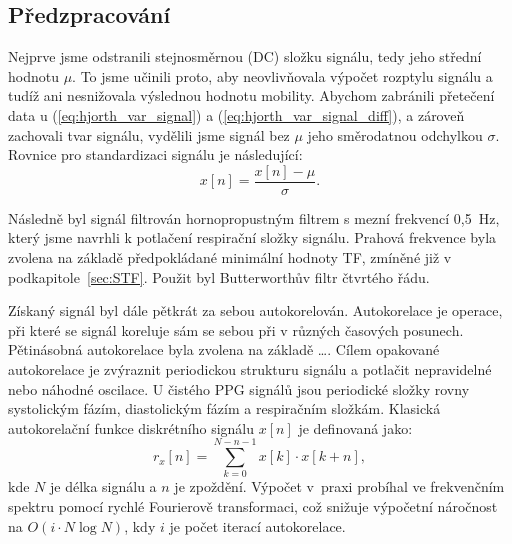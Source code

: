 \subsection*{Předzpracování}
\label{sec:predzpracovani}
Nejprve jsme odstranili stejnosměrnou (\acs{DC}) složku signálu, tedy jeho střední hodnotu \(\mu\).
To jsme učinili proto, aby neovlivňovala výpočet rozptylu signálu a tudíž ani nesnižovala výslednou hodnotu mobility.
Abychom zabránili přetečení data u (\ref{eq:hjorth_var_signal}) a (\ref{eq:hjorth_var_signal_diff}), a zároveň zachovali tvar signálu, vydělili jsme signál bez \( \mu \) jeho směrodatnou odchylkou \( \sigma \). Rovnice pro standardizaci signálu je následující:
\begin{equation}
	x[n] = \frac{x[n] - \mu}{\sigma}.
\end{equation}

Následně byl signál filtrován hornopropustným filtrem s mezní frekvencí 0,5~Hz, který jsme navrhli k potlačení respirační složky signálu.
Prahová frekvence byla zvolena na základě předpokládané minimální hodnoty \acs{TF}, zmíněné již v podkapitole~\ref{sec:STF}.
Použit byl Butterworthův filtr čtvrtého řádu.

Získaný signál byl dále pětkrát za sebou autokorelován. %
Autokorelace je operace, při které se signál koreluje sám se sebou při v různých časových posunech.
Pětinásobná autokorelace byla zvolena na základě \dots. %
Cílem opakované autokorelace je zvýraznit periodickou strukturu signálu a potlačit nepravidelné nebo náhodné oscilace.
U čistého \acs{PPG} signálů jsou periodické složky rovny systolickým fázím, diastolickým fázím a respiračním složkám.
Klasická autokorelační funkce diskrétního signálu \( x[n] \) je definovaná jako:
\begin{equation}
	r_x[n] = \sum_{k=0}^{N-n-1} x[k] \cdot x[k+n],
\end{equation}
kde \( N \) je délka signálu a \( n \) je zpoždění.
Výpočet v~praxi probíhal ve frekvenčním spektru pomocí rychlé Fourierově transformaci, což snižuje výpočetní náročnost na \( O(i \cdot N \log N) \), kdy \( i \) je počet iterací autokorelace.

